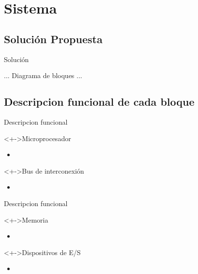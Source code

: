 \documentclass[xcolor=dvipsnames]{beamer}
\begin{document}
\section{Sistema}
\subsection{Solución Propuesta}
\begin{frame}{Solución}

... Diagrama de bloques ...

\end{frame}

\subsection{Descripcion funcional de cada bloque}
\begin{frame}{Descripcion funcional}
\begin{block}<+->{Microprocesador}   
    \begin{itemize}
      \scriptsize
     	\item
    \end{itemize}
  \end{block}
  \begin{block}<+->{Bus de interconexión}   
    \begin{itemize}
      \scriptsize
     	\item
    \end{itemize}
  \end{block}
\end{frame}
\begin{frame}{Descripcion funcional}
\begin{block}<+->{Memoria}   
    \begin{itemize}
      \scriptsize
     	\item
    \end{itemize}
  \end{block}
  \begin{block}<+->{Dispositivos de E/S}   
    \begin{itemize}
      \scriptsize
     	\item
    \end{itemize}
  \end{block}
\end{frame}
\end{document}

